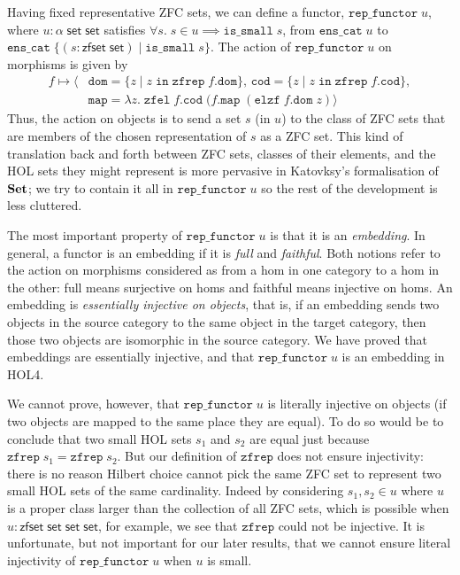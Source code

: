 \documentclass[twoside,titlepage,11pt]{article}
\begin{document}
Having fixed representative ZFC sets, we can define a functor, $\mathtt{rep\_functor}\;u$, where $u:\alpha\;\mathsf{set}\;\mathsf{set}$ satisfies $\forall{s}.\;s\in u\implies\mathtt{is\_small}\;s$, from $\mathtt{ens\_cat}\;u$ to $\mathtt{ens\_cat}\;\{(s:\mathsf{zfset}\;\mathsf{set})\mid\mathtt{is\_small}\;s\}$.
The action of $\mathtt{rep\_functor}\;u$ on morphisms is given by
\begin{align*}
f\mapsto\langle&\mathtt{dom}=\{z\mid z\operatorname{\mathtt{in}}\mathtt{zfrep}\;f.\mathtt{dom}\},\,\mathtt{cod}=\{z\mid z\operatorname{\mathtt{in}}\mathtt{zfrep}\;f.\mathtt{cod}\},\\
&\mathtt{map}=\lambda{z}.\;\mathtt{zfel}\;f.\mathtt{cod}\;(f.\mathtt{map}\;(\mathtt{elzf}\;f.\mathtt{dom}\;z)\rangle
\end{align*}
Thus, the action on objects is to send a set $s$ (in $u$) to the class of ZFC sets that are members of the chosen representation of $s$ as a ZFC set.
This kind of translation back and forth between ZFC sets, classes of their elements, and the HOL sets they might represent is more pervasive in Katovksy's formalisation of $\mathbf{Set}$; we try to contain it all in $\mathtt{rep\_functor}\;u$ so the rest of the development is less cluttered. 

The most important property of $\mathtt{rep\_functor}\;u$ is that it is an \emph{embedding}.
In general, a functor is an embedding if it is \emph{full} and \emph{faithful}.
Both notions refer to the action on morphisms considered as from a hom in one category to a hom in the other: full means surjective on homs and faithful means injective on homs.
An embedding is \emph{essentially injective on objects}, that is, if an embedding sends two objects in the source category to the same object in the target category, then those two objects are isomorphic in the source category.
We have proved that embeddings are essentially injective, and that $\mathtt{rep\_functor}\;u$ is an embedding in HOL4.

We cannot prove, however, that $\mathtt{rep\_functor}\;u$ is literally injective on objects (if two objects are mapped to the same place they are equal).
To do so would be to conclude that two small HOL sets $s_1$ and $s_2$ are equal just because $\mathtt{zfrep}\;s_1=\mathtt{zfrep}\;s_2$.
But our definition of $\mathtt{zfrep}$ does not ensure injectivity: there is no reason Hilbert choice cannot pick the same ZFC set to represent two small HOL sets of the same cardinality.
Indeed by considering $s_1,s_2\in u$ where $u$ is a proper class larger than the collection of all ZFC sets, which is possible when $u:\mathsf{zfset}\;\mathsf{set}\;\mathsf{set}\;\mathsf{set}$, for example, we see that $\mathtt{zfrep}$ could not be injective.
It is unfortunate, but not important for our later results, that we cannot ensure literal injectivity of $\mathtt{rep\_functor}\;u$ when $u$ is small.
\end{document}
